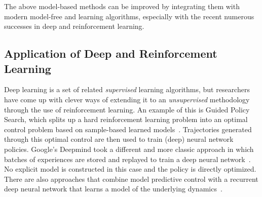 

The above model-based methods can be improved by integrating them with
modern model-free and learning algorithms, especially with the recent
numerous successes in deep and reinforcement learning.



\subsection{Application of Deep and Reinforcement Learning}

Deep learning is a set of related \emph{supervised} learning
algorithms, but researchers have come up with clever ways of extending
it to an \emph{unsupervised} methodology through the use of
reinforcement learning.  An example of this is Guided Policy Search,
which splits up a hard reinforcement learning problem into an optimal
control problem based on sample-based learned
models~\cite{levine2015learning}.  Trajectories generated through this
optimal control are then used to train (deep) neural network policies.
Google's Deepmind took a different and more classic approach in which
batches of experiences are stored and replayed to train a deep neural
network~\cite{mnih2015human}.  No explicit model is constructed in
this case and the policy is directly optimized.  There are also
approaches that combine model predictive control with a recurrent deep
neural network that learns a model of the underlying
dynamics~\cite{lenzdeepmpc}.

